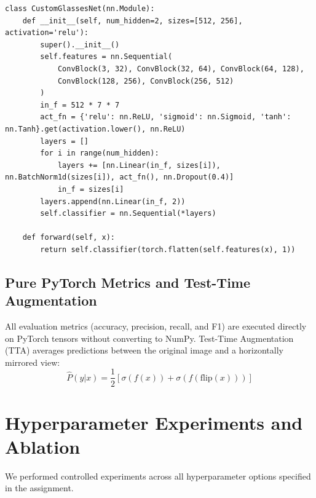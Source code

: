 \documentclass[11pt,a4paper]{article}
\begin{document}
\begin{lstlisting}
class CustomGlassesNet(nn.Module):
    def __init__(self, num_hidden=2, sizes=[512, 256], activation='relu'):
        super().__init__()
        self.features = nn.Sequential(
            ConvBlock(3, 32), ConvBlock(32, 64), ConvBlock(64, 128),
            ConvBlock(128, 256), ConvBlock(256, 512)
        )
        in_f = 512 * 7 * 7
        act_fn = {'relu': nn.ReLU, 'sigmoid': nn.Sigmoid, 'tanh': nn.Tanh}.get(activation.lower(), nn.ReLU)
        layers = []
        for i in range(num_hidden):
            layers += [nn.Linear(in_f, sizes[i]), nn.BatchNorm1d(sizes[i]), act_fn(), nn.Dropout(0.4)]
            in_f = sizes[i]
        layers.append(nn.Linear(in_f, 2))
        self.classifier = nn.Sequential(*layers)

    def forward(self, x):
        return self.classifier(torch.flatten(self.features(x), 1))
\end{lstlisting}

\subsection{Pure PyTorch Metrics and Test-Time Augmentation}
All evaluation metrics (accuracy, precision, recall, and F1) are executed directly on PyTorch tensors without converting to NumPy. Test-Time Augmentation (TTA) averages predictions between the original image and a horizontally mirrored view:
\begin{equation}
\hat{P}(y|x) = \frac{1}{2} \left[ \sigma\left(f(x)\right) + \sigma\left(f(\text{flip}(x))\right) \right]
\end{equation}

\section{Hyperparameter Experiments and Ablation}
We performed controlled experiments across all hyperparameter options specified in the assignment.
\end{document}
